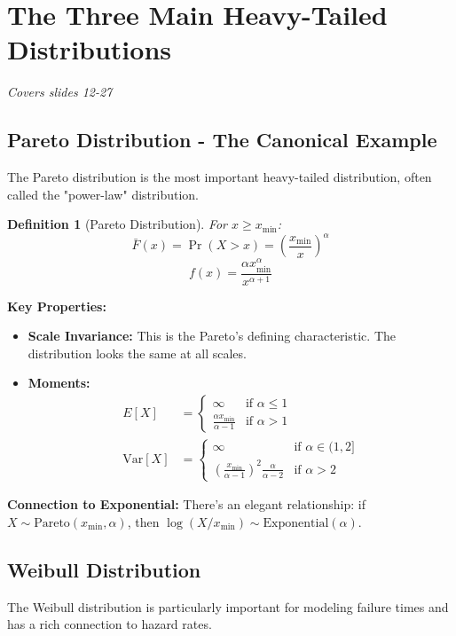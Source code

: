 \documentclass[11pt]{article}
\newtheorem{definition}{Definition}
\begin{document}
\section{The Three Main Heavy-Tailed Distributions}
\textit{Covers slides 12-27}

\subsection{Pareto Distribution - The Canonical Example}

The Pareto distribution is the most important heavy-tailed distribution, often called the "power-law" distribution.

\begin{definition}[Pareto Distribution]
For $x \geq x_{\min}$:
$$\bar{F}(x) = \Pr(X > x) = \left(\frac{x_{\min}}{x}\right)^{\alpha}$$
$$f(x) = \frac{\alpha x_{\min}^{\alpha}}{x^{\alpha+1}}$$
\end{definition}

\textbf{Key Properties:}
\begin{itemize}
\item \textbf{Scale Invariance:} This is the Pareto's defining characteristic. The distribution looks the same at all scales.
\item \textbf{Moments:} 
  \begin{align}
  E[X] &= \begin{cases} 
  \infty & \text{if } \alpha \leq 1 \\
  \frac{\alpha x_{\min}}{\alpha-1} & \text{if } \alpha > 1
  \end{cases}\\
  \text{Var}[X] &= \begin{cases}
  \infty & \text{if } \alpha \in (1,2] \\
  \left(\frac{x_{\min}}{\alpha-1}\right)^2 \frac{\alpha}{\alpha-2} & \text{if } \alpha > 2
  \end{cases}
  \end{align}
\end{itemize}

\textbf{Connection to Exponential:} There's an elegant relationship: if $X \sim \text{Pareto}(x_{\min}, \alpha)$, then $\log(X/x_{\min}) \sim \text{Exponential}(\alpha)$.

\subsection{Weibull Distribution}

The Weibull distribution is particularly important for modeling failure times and has a rich connection to hazard rates.
\end{document}
